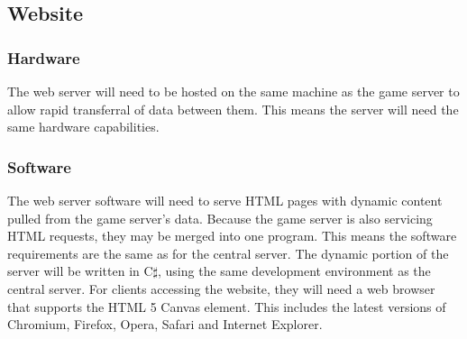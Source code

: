 	\subsection{Website}
		\subsubsection{Hardware}
			The web server will need to be hosted on the same machine as the
			game server to allow rapid transferral of data between them. This
			means the server will need the same hardware capabilities.

		\subsubsection{Software}
			The web server software will need to serve HTML pages with dynamic
			content pulled from the game server's data. Because the game server
			is also servicing HTML requests, they may be merged into one
			program. This means the software requirements are the same as for
			the central server. The dynamic portion of the server will be
			written in C$\sharp$, using the same development environment as the
			central server. For clients accessing the website, they will need a
			web browser that supports the HTML 5 Canvas element. This includes
			the latest versions of Chromium, Firefox, Opera, Safari and
			Internet Explorer.
